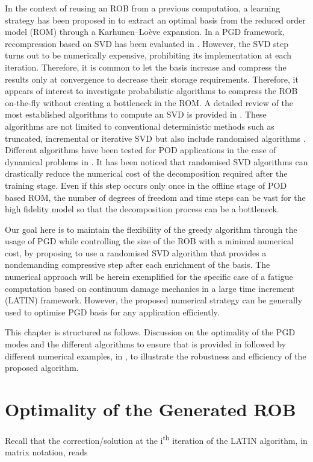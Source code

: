 In the context of reusing an ROB from a previous computation, a learning strategy has been proposed in {\parencite{ryckelynck2002reduction,ryckelynck2005priori}} to extract an optimal basis from the reduced order model (ROM) through a Karhunen--Lo\`{e}ve expansion. In a PGD framework, recompression based on SVD has been evaluated in \parencite{Giacoma2016}. However, the SVD step turns out to be numerically expensive, prohibiting its implementation at each iteration. Therefore, it is common to let the basis increase and compress the results only at convergence to decrease their storage requirements. Therefore, it appears of interest to investigate probabilistic algorithms to compress the ROB on-the-fly without creating a bottleneck in the ROM. A detailed review of the most established algorithms to compute an SVD is provided in \parencite{Golub_VanLoan_1996,Bach_Ceglia_2018}. These algorithms are not limited to conventional deterministic methods such as truncated, incremental or iterative SVD but also include randomised algorithms \parencite{halko2011finding}. Different algorithms have been tested for POD applications in the case of dynamical problems in \parencite{Bach_Ceglia_2018}. It has been noticed that randomised SVD algorithms can drastically reduce the numerical cost of the decomposition required after the training stage. Even if this step occurs only once in the offline stage of POD based ROM, the number of degrees of freedom and time steps can be vast for the high fidelity model so that the decomposition process can be a bottleneck.

Our goal here is to maintain the flexibility of the greedy algorithm through the usage of PGD while controlling the size of the ROB with a minimal numerical cost, by proposing to use a randomised SVD algorithm that provides a nondemanding compressive step after each enrichment of the basis. The numerical approach will be herein exemplified for the specific case of a fatigue computation based on continuum damage mechanics in a large time increment (LATIN) framework. However, the proposed numerical strategy can be generally used to optimise PGD basis for any application efficiently.

This chapter is structured as follows. Discussion on the optimality of the PGD modes and the different algorithms to ensure that is provided in  followed by different numerical examples, in , to illustrate the robustness and efficiency of the proposed algorithm.

\section{Optimality of the Generated ROB}
\label{sec_orth}
Recall that the correction/solution at the i\textsuperscript{th} iteration of the LATIN algorithm, in matrix notation, reads

